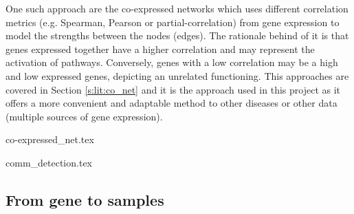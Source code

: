 One such approach are the co-expressed networks which uses different correlation metrics (e.g. Spearman, Pearson or partial-correlation) from gene expression to model the strengths between the nodes (edges). The rationale behind of it is that genes expressed together have a higher correlation and may represent the activation of pathways. Conversely, genes with a low correlation may be a high and low expressed genes, depicting an unrelated functioning. This approaches are covered in Section \ref{s:lit:co_net} and it is the approach used in this project as it offers a more convenient and adaptable method to other diseases or other data (multiple sources of gene expression).

{co-expressed_net.tex}

{comm_detection.tex}


\subsection{From gene to samples}
